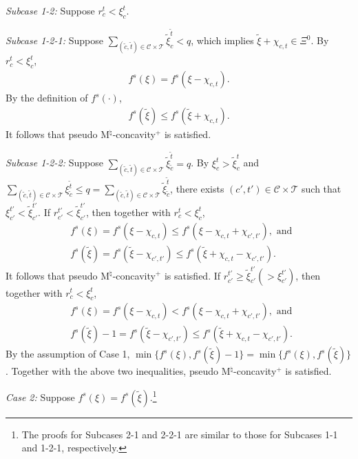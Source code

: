 \documentclass[12pt]{amsart}
\newcommand{\corigin}{c'}
\theoremstyle{remark}
\begin{document}
\smallskip
\noindent
\emph{Subcase 1-2:}
Suppose $r_c^t<\xi_c^t$.

\smallskip
\noindent
\emph{Subcase 1-2-1:}
Suppose $\sum_{(\tilde c, \tilde t)\in \mathcal{C}\times \mathcal{T}}\tilde \xi_{c}^{\tilde t}<q$, which implies $\tilde \xi+\chi_{c,t}\in \Xi^0$.
By $r_c^t<\xi_c^t$,
\begin{align*}
f^s(\xi)=f^s(\xi-\chi_{c, t}).
\end{align*}
By the definition of $f^s(\cdot)$,
\begin{align*}
f^s(\tilde \xi)\leq f^s(\tilde \xi+\chi_{c,t}).
\end{align*}
It follows that pseudo M$^\natural$-concavity$^+$ is satisfied.

\smallskip
\noindent
\emph{Subcase 1-2-2:}
Suppose $\sum_{(\tilde c, \tilde t)\in \mathcal{C}\times \mathcal{T}}\tilde \xi_{\tilde c}^{\tilde t}=q$.
By $\xi_c^t>\tilde \xi_c^t$ and $\sum_{(\tilde c,\tilde t)\in \mathcal{C}\times \mathcal{T}}\xi_{\tilde c}^{\tilde t}\leq q=\sum_{(\tilde c, \tilde t)\in \mathcal{C}\times \mathcal{T}}\tilde \xi_{\tilde c}^{\tilde t}$, there exists $(\corigin,t')\in \mathcal{C}\times \mathcal{T}$ such that $\xi_{\corigin}^{t'}<\tilde \xi_{\corigin}^{t'}$. If $r_{\corigin}^{t'}<\tilde \xi_{\corigin}^{t'}$, then together with $r_c^t<\xi_c^t$,
\begin{align*}
&f^s(\xi)=f^s(\xi-\chi_{c,t})\leq f^s(\xi-\chi_{c,t}+\chi_{\corigin,t'}), \text{ and } \\
&f^s(\tilde \xi)=f^s(\tilde \xi-\chi_{\corigin,t'})\leq f^s(\tilde \xi+\chi_{c,t}-\chi_{\corigin,t'}).
\end{align*}
It follows that pseudo M$^\natural$-concavity$^+$ is satisfied. If $r_{\corigin}^{t'}\geq \tilde \xi_{\corigin}^{t'}(>\xi_{\corigin}^{t'})$, then together with $r_c^t<\xi_c^t$,
\begin{align*}
&f^s(\xi)=f^s(\xi-\chi_{c,t})< f^s(\xi-\chi_{c,t}+\chi_{\corigin,t'}), \text{ and } \\
&f^s(\tilde \xi)-1=f^s(\tilde \xi-\chi_{\corigin,t'})\leq f^s(\tilde \xi+\chi_{c,t}-\chi_{\corigin,t'}).
\end{align*}
By the assumption of Case 1, $\min\{f^s(\xi), f^s(\tilde \xi)-1\}=\min\{f^s(\xi), f^s(\tilde \xi)\}$. Together with the above two inequalities, pseudo M$^\natural$-concavity$^+$ is satisfied.

\smallskip
\noindent
\emph{Case 2:}
Suppose $f^s(\xi)=f^s(\tilde \xi)$.\footnote{The proofs for Subcases 2-1 and 2-2-1 are similar to those for Subcases 1-1 and 1-2-1, respectively.}
\end{document}
